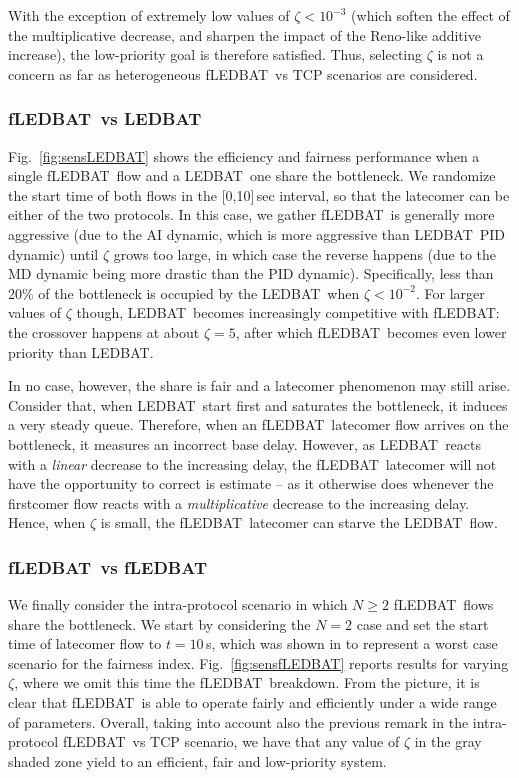 \documentclass[conference]{IEEEtran}
\newcommand{\figR}[1]{Fig.~\ref{fig:#1}}
\newcommand{\btledbat}[0]{LEDBAT}
\newcommand{\fledbat}[0]{fLEDBAT}
\begin{document}
With the exception of extremely low values of $\zeta<10^{-3}$  (which soften the effect of the multiplicative decrease, and sharpen the impact of the Reno-like additive increase), the low-priority goal is therefore satisfied. Thus, selecting $\zeta$ is not a concern as far as heterogeneous \fledbat\ vs TCP scenarios are considered.



\subsubsection{\fledbat\ vs \btledbat}

\figR{sensLEDBAT} shows the efficiency and fairness performance when a single \fledbat\ flow and a \btledbat\ one share the bottleneck. We randomize the start time of both flows in the [0,10]\,sec interval, so that the latecomer can be either of the two protocols.
In this case, we gather \fledbat\ is generally more aggressive (due to the AI dynamic, which is more aggressive than \btledbat\ PID dynamic) until $\zeta$ grows too large, in which case the reverse happens (due to the MD dynamic being more drastic than the PID dynamic).
Specifically, less than 20\% of the bottleneck is occupied by the \btledbat\ when  $\zeta<10^{-2}$. For larger values of $\zeta$ though, \btledbat\ becomes increasingly competitive with  \fledbat: the crossover happens at about $\zeta=5$, after which \fledbat\ becomes even lower priority than \btledbat.

In no case, however, the share is fair and a latecomer phenomenon may still arise. Consider that, when \btledbat\ start first and saturates the bottleneck, it induces a very steady queue. Therefore, when an \fledbat\  latecomer flow arrives on the bottleneck, it measures an incorrect base delay. However, as \btledbat\ reacts with a \emph{linear} decrease to the increasing delay, the \fledbat\ latecomer will not have the opportunity to correct is estimate -- as it otherwise does whenever the firstcomer flow reacts with a \emph{multiplicative} decrease to the increasing delay. Hence, when $\zeta$ is small, the \fledbat\  latecomer can starve the \btledbat\ flow.


\subsubsection{\fledbat\ vs \fledbat}

We finally consider the intra-protocol scenario in which $N\ge2$ \fledbat\ flows share the bottleneck. We start by considering the $N=2$ case and set the start time of latecomer flow to $t=10$\,s, which was shown in \cite{icccn10} to
represent a worst case scenario for the fairness index.
\figR{sensfLEDBAT} reports results for varying $\zeta$, where we omit this time the \fledbat\ breakdown. From the picture, it is clear  that \fledbat\ is able to operate fairly and efficiently under a wide range of parameters. Overall, taking into account also the previous remark in the intra-protocol \fledbat\ vs TCP scenario, we have that any value of $\zeta$ in the gray shaded zone yield to an efficient, fair  and low-priority system.
\end{document}
